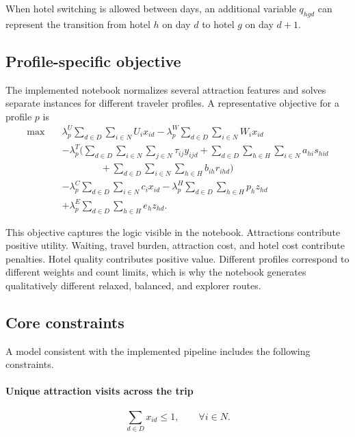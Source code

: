 \documentclass[12pt,a4paper]{article}
\begin{document}
When hotel switching is allowed between days, an additional variable \(q_{hgd}\) can represent the transition from hotel \(h\) on day \(d\) to hotel \(g\) on day \(d+1\).

\subsection{Profile-specific objective}

The implemented notebook normalizes several attraction features and solves separate instances for different traveler profiles. A representative objective for a profile \(p\) is
\begin{equation}
\begin{aligned}
\max \quad
& \lambda_p^{U} \sum_{d\in D}\sum_{i\in N} U_i x_{id}
- \lambda_p^{W} \sum_{d\in D}\sum_{i\in N} W_i x_{id} \\
& - \lambda_p^{T} \Big(
    \sum_{d\in D}\sum_{i\in N}\sum_{j\in N} \tau_{ij} y_{ijd}
    + \sum_{d\in D}\sum_{h\in H}\sum_{i\in N} a_{hi}s_{hid} \\
& \qquad\qquad
    + \sum_{d\in D}\sum_{i\in N}\sum_{h\in H} b_{ih}r_{ihd}
  \Big) \\
& - \lambda_p^{C}\sum_{d\in D}\sum_{i\in N} c_i x_{id}
- \lambda_p^{H}\sum_{d\in D}\sum_{h\in H} p_h z_{hd} \\
& + \lambda_p^{E}\sum_{d\in D}\sum_{h\in H} e_h z_{hd}.
\end{aligned}
\label{eq:hotelaware_obj}
\end{equation}

This objective captures the logic visible in the notebook. Attractions contribute positive utility. Waiting, travel burden, attraction cost, and hotel cost contribute penalties. Hotel quality contributes positive value. Different profiles correspond to different weights and count limits, which is why the notebook generates qualitatively different relaxed, balanced, and explorer routes.

\subsection{Core constraints}

A model consistent with the implemented pipeline includes the following constraints.

\paragraph{Unique attraction visits across the trip}
\begin{equation}
\sum_{d \in D} x_{id} \le 1, \qquad \forall i \in N.
\label{eq:once}
\end{equation}
\end{document}
